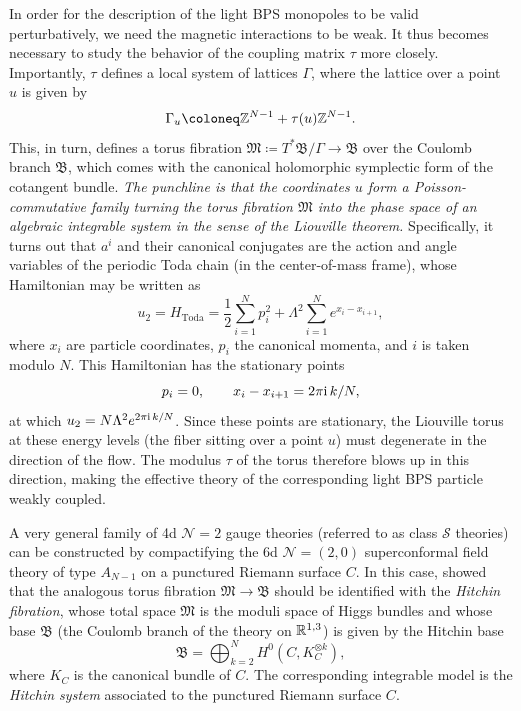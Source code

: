 In order for the description of the light BPS monopoles to be valid perturbatively, we need the magnetic interactions to be weak. It thus becomes necessary to study the behavior of the coupling matrix $\tau$ more closely. Importantly, $\tau$ defines a local system of lattices $\Gamma$, where the lattice over a point $u$ is given by
\begin{equation}
	\Gamma_u \coloneq \Z^{N-1} + \tau(u) \Z^{N-1}.
\end{equation}
This, in turn, defines a torus fibration $\mathfrak{M} \coloneq T^*\mathfrak{B}/\Gamma \to \mathfrak{B}$ over the Coulomb branch $\mathfrak{B}$, which comes with the canonical holomorphic symplectic form of the cotangent bundle. \emph{The punchline is that the coordinates $u$ form a Poisson-commutative family turning the torus fibration $\mathfrak{M}$ into the phase space of an algebraic integrable system in the sense of the Liouville theorem.} Specifically, it turns out that $a^i$ and their canonical conjugates are the action and angle variables of the periodic Toda chain (in the center-of-mass frame), whose Hamiltonian may be written as
\begin{equation}
	u_2 = H_\text{Toda} = \frac{1}{2} \sum_{i=1}^{N} p_i^2 + \Lambda^2 \sum_{i=1}^{N} e^{x_i - x_{i+1}},
\end{equation}
where $x_i$ are particle coordinates, $p_i$ the canonical momenta, and $i$ is taken modulo $N$. This Hamiltonian has the stationary points
\begin{equation}
	p_i = 0, \qquad x_i - x_{i+1} = 2\pi\mathrm{i}\,k/N,
\end{equation}
at which $u_2 = N\Lambda^2 e^{2\pi\mathrm{i}\,k/N}$. Since these points are stationary, the Liouville torus at these energy levels (the fiber sitting over a point $u$) must degenerate in the direction of the flow. The modulus $\tau$ of the torus therefore blows up in this direction, making the effective theory of the corresponding light BPS particle weakly coupled.

A very general family of 4d $\mathcal{N}=2$ gauge theories (referred to as class $\mathcal{S}$ theories) can be constructed by compactifying the 6d $\mathcal{N}=(2,0)$ superconformal field theory of type $A_{N-1}$ on a punctured Riemann surface $C$. In this case, \cite{gaiotto_wall-crossing_2011} showed that the analogous torus fibration $\mathfrak{M} \to \mathfrak{B}$ should be identified with the \emph{Hitchin fibration}, whose total space $\mathfrak{M}$ is the moduli space of Higgs bundles and whose base $\mathfrak{B}$ (the Coulomb branch of the theory on $\mathbb{R}^{1,3}$) is given by the Hitchin base
\begin{equation}
	\mathfrak{B} = \bigoplus_{k=2}^N H^0(C,K_C^{\otimes k}),
\end{equation}
where $K_C$ is the canonical bundle of $C$. The corresponding integrable model is the \emph{Hitchin system} associated to the punctured Riemann surface $C$.

